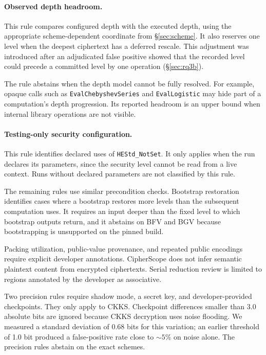 \documentclass[sigconf,nonacm]{acmart}
\begin{document}
\paragraph{Observed depth headroom.} This rule compares configured depth with
the executed depth, using the appropriate scheme-dependent coordinate from
\S\ref{sec:scheme}. It also reserves one level when the deepest ciphertext
has a deferred rescale. This adjustment was introduced after an adjudicated
false positive showed that the recorded level could precede a committed level
by one operation (\S\ref{sec:rq3b}).

The rule abstains when the depth model cannot be fully resolved. For example,
opaque calls such as \texttt{EvalChebyshevSeries} and
\texttt{EvalLogistic} may hide part of a computation's depth progression. Its
reported headroom is an upper bound when internal library operations are not
visible.

\paragraph{Testing-only security configuration.} This rule identifies
declared uses of \texttt{HEStd\_NotSet}. It only applies when the run
declares its parameters, since the security level cannot be read from a live
context. Runs without declared parameters are not classified by this rule.

The remaining rules use similar precondition checks. Bootstrap restoration
identifies cases where a bootstrap restores more levels than the subsequent
computation uses. It requires an input deeper than the fixed level to which
bootstrap outputs return, and it abstains on BFV and BGV because
bootstrapping is unsupported on the pinned build.

Packing utilization, public-value provenance, and repeated public encodings
require explicit developer annotations. CipherScope does not infer semantic
plaintext content from encrypted ciphertexts. Serial reduction review is
limited to regions annotated by the developer as associative.

Two precision rules require shadow mode, a secret key, and developer-provided
checkpoints. They only apply to CKKS. Checkpoint differences smaller than 3.0
absolute bits are ignored because CKKS decryption uses noise flooding. We
measured a standard deviation of 0.68 bits for this variation; an earlier
threshold of 1.0 bit produced a false-positive rate close to ${\sim}5\%$ on
noise alone. The precision rules abstain on the exact schemes.
\end{document}
